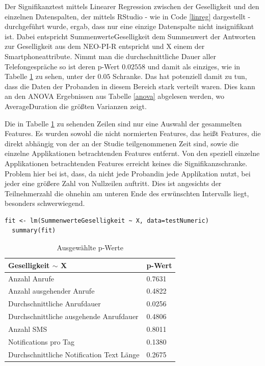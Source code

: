 Der Signifikanztest mittels Linearer Regression zwischen der Geselligkeit und den einzelnen Datenspalten, der mittels RStudio - wie in Code \ref{linreg} dargestellt - durchgeführt wurde, ergab, 
dass nur eine einzige Datenspalte nicht insignifikant ist.
Dabei entspricht SummenwerteGeselligkeit dem Summenwert der Antworten zur Geselligkeit aus dem NEO-PI-R entspricht und X einem der Smartphoneattribute.
Nimmt man die durchschnittliche Dauer aller Telefongespräche so ist deren p-Wert $0.02558$ und damit als einziges, wie in Tabelle \ref{pvalues} zu sehen, unter der $0.05$ Schranke.
Das hat potenziell damit zu tun, dass die Daten der Probanden in diesem Bereich stark verteilt waren. 
Dies kann an den ANOVA Ergebnissen aus Tabelle \ref{anova} abgelesen werden, wo AverageDuration die größten Varianzen zeigt.

\par
Die in Tabelle \ref{pvalues} zu sehenden Zeilen sind nur eine Auswahl der gesammelten Features.
Es wurden sowohl die nicht normierten Features, das heißt Features, die direkt abhängig von der an der Studie teilgenommenen Zeit sind, sowie die einzelne Applikationen betrachtenden Features entfernt.
Von den speziell einzelne Applikationen betrachtenden Features erreicht keines die Signifikanzschranke.
Problem hier bei ist, dass, da nicht jede Probandin jede Applikation nutzt, bei jeder eine größere Zahl von Nullzeilen auftritt.
Dies ist angesichts der Teilnehmerzahl die ohnehin am unteren Ende des erwünschten Intervalls liegt, besonders schwerwiegend.


\begin{lstlisting}[frame=single, caption = Lineare Regression, label=linreg] 
  fit <- lm(SummenwerteGeselligkeit ~ X, data=testNumeric)
  summary(fit)
\end{lstlisting}

\begin{table}[]
\centering
\caption{Ausgewählte p-Werte}
\label{pvalues}
\begin{tabular}{@{}ll@{}}
\toprule
Geselligkeit $\sim$ X                     & p-Wert \\ \midrule
Anzahl Anrufe                             & 0.7631 \\
Anzahl ausgehender Anrufe                 & 0.4822 \\
Durchschnittliche Anrufdauer              & 0.0256 \\
Durchschnittliche ausgehende Anrufdauer   & 0.4806 \\
Anzahl SMS                                & 0.8011 \\
Notifications pro Tag                     & 0.1380 \\
Durchschnittliche Notification Text Länge & 0.2675 \\ \bottomrule
\end{tabular}
\end{table}

